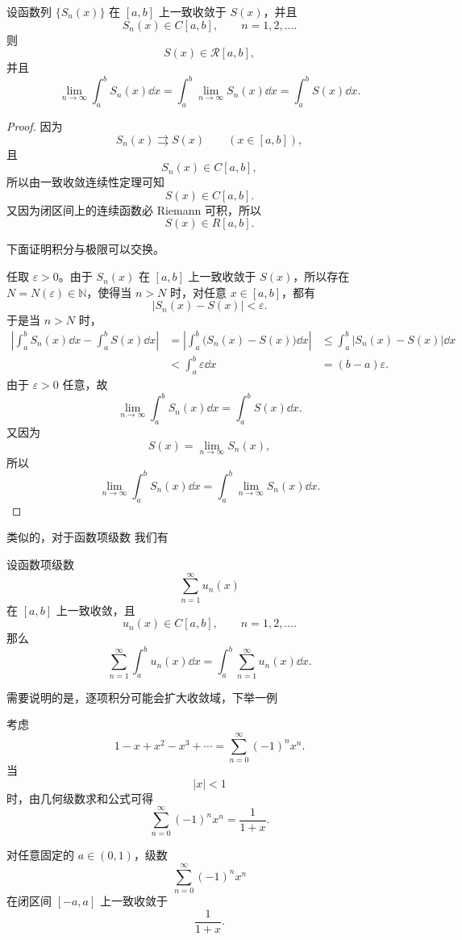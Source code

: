 \begin{proposition}\label{逐项可积}
	设函数列 $\{S_n(x)\}$ 在 $[a,b]$ 上一致收敛于 $S(x)$，并且
	\[
	S_n(x)\in C[a,b],\qquad n=1,2,\dots .
	\]
	则
	\[
	S(x)\in \mathcal{R}[a,b],
	\]
	并且
	\[
	\lim_{n\to\infty}\int_a^b S_n(x)\dd x 
	=
	\int_a^b \lim_{n\to\infty}S_n(x)\dd x 
	=
	\int_a^b S(x)\dd x .
	\]
	
\end{proposition}
	

\begin{proof}
	因为
	\[
	S_n(x)\rightrightarrows S(x)\qquad (x\in [a,b]),
	\]
	且
	\[
	S_n(x)\in C[a,b],
	\]
	所以由一致收敛连续性定理可知
	\[
	S(x)\in C[a,b].
	\]
	又因为闭区间上的连续函数必 Riemann 可积，所以
	\[
	S(x)\in R[a,b].
	\]
	
	下面证明积分与极限可以交换。
	
	任取 $\varepsilon>0$。由于 $S_n(x)$ 在 $[a,b]$ 上一致收敛于 $S(x)$，所以存在 $N=N(\varepsilon)\in\mathbb N$，使得当 $n>N$ 时，对任意 $x\in [a,b]$，都有
	\[
	|S_n(x)-S(x)|<\varepsilon .
	\]
	于是当 $n>N$ 时，
	\[
	\begin{aligned}
		\left|
		\int_a^b S_n(x)\dd x-\int_a^b S(x)\dd x
		\right|
		&=
		\left|
		\int_a^b \bigl(S_n(x)-S(x)\bigr)\dd x
		\right|&\leq
		\int_a^b |S_n(x)-S(x)|\dd x \\
		&<
		\int_a^b \varepsilon\dd x &=
		(b-a)\varepsilon .
	\end{aligned}
	\]
	由于 $\varepsilon>0$ 任意，故
	\[
	\lim_{n\to\infty}\int_a^b S_n(x)\dd x
	=
	\int_a^b S(x)\dd x .
	\]
	又因为
	\[
	S(x)=\lim_{n\to\infty}S_n(x),
	\]
	所以
	\[
	\lim_{n\to\infty}\int_a^b S_n(x)\dd x
	=
	\int_a^b \lim_{n\to\infty}S_n(x)\dd x .
	\]

\end{proof}

类似的，对于函数项级数 我们有

设函数项级数
\[
\sum_{n=1}^{\infty}u_n(x)
\]
在 $[a,b]$ 上一致收敛，且
\[
u_n(x)\in C[a,b],\qquad n=1,2,\dots .
\]
那么
	\[
\sum_{n=1}^{\infty}\int_a^b u_n(x)\dd x
=
\int_a^b \sum_{n=1}^{\infty}u_n(x)\dd x .
\]

需要说明的是，逐项积分可能会扩大收敛域，下举一例





\begin{example}
	考虑
	\[
	1-x+x^2-x^3+\cdots
	=
	\sum_{n=0}^{\infty}(-1)^n x^n .
	\]
	当
	\[
	|x|<1
	\]
	时，由几何级数求和公式可得
	\[
	\sum_{n=0}^{\infty}(-1)^n x^n
	=
	\frac{1}{1+x}.
	\]
	
	对任意固定的 $a\in(0,1)$，级数
	\[
	\sum_{n=0}^{\infty}(-1)^n x^n
	\]
	在闭区间 $[-a,a]$ 上一致收敛于
	\[
	\frac{1}{1+x}.
	\]
\end{example}

